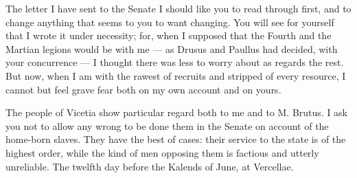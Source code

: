 

 The letter I have sent to the Senate I should like you to read through first, and to change anything that seems to you to want changing. You will see for yourself that I wrote it under necessity; for, when I supposed that the Fourth and the Martian legions would be with me --- as Drusus and Paullus had decided, with your concurrence --- I thought there was less to worry about as regards the rest. But now, when I am with the rawest of recruits and stripped of every resource, I cannot but feel grave fear both on my own account and on yours.

 The people of Vicetia show particular regard both to me and to M. Brutus. I ask you not to allow any wrong to be done them in the Senate on account of the home-born slaves. They have the best of cases: their service to the state is of the highest order, while the kind of men opposing them is factious and utterly unreliable. The twelfth day before the Kalends of June, at Vercellae.
